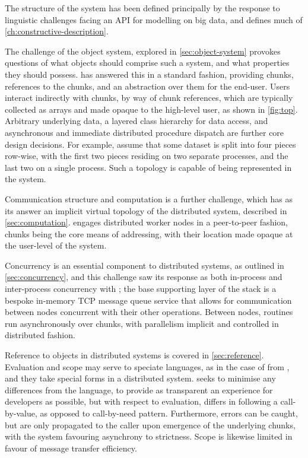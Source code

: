 The structure of the \lsr{} system has been defined principally by the response to linguistic challenges facing an API for modelling on big data, and defines much of \cref{ch:constructive-description}.

The challenge of the object system, explored in \cref{sec:object-system} provokes questions of what objects should comprise such a system, and what properties they should possess.
\lsr{} has answered this in a standard fashion, providing chunks, references to the chunks, and an abstraction over them for the end-user.
Users interact indirectly with chunks, by way of chunk references, which are typically collected as arrays and made opaque to the high-level user, as shown in \cref{fig:top}.
Arbitrary underlying data, a layered class hierarchy for data access, and asynchronous and immediate distributed procedure dispatch are further core design decisions.
For example, assume that some dataset is split into four pieces row-wise, with the first two pieces residing on two separate processes, and the last two on a single process.
Such a topology is capable of being represented in the \lsr{} system.


Communication structure and computation is a further challenge, which has as its answer an implicit virtual topology of the distributed system, described in \cref{sec:computation}.
\lsr{} engages distributed worker nodes in a peer-to-peer fashion, chunks being the core means of addressing, with their location made opaque at the user-level of the system.

Concurrency is an essential component to distributed systems, as outlined in \cref{sec:concurrency}, and this challenge saw its response as both in-process and inter-process concurrency with \lsr{}; the base supporting layer of the \lsr{} stack is a bespoke in-memory TCP message queue service that allows for communication between nodes concurrent with their other operations.
Between nodes, routines run asynchronously over chunks, with parallelism implicit and controlled in distributed fashion.

Reference to objects in distributed systems is covered in \cref{sec:reference}.
Evaluation and scope may serve to speciate languages, as in the case of \R{} from , and they take special forms in a distributed system.
\lsr{} seeks to minimise any differences from the \R{} language, to provide as transparent an experience for developers as possible, but with respect to evaluation, differs in following a call-by-value, as opposed to call-by-need pattern.
Furthermore, errors can be caught, but are only propagated to the caller upon emergence of the underlying chunks, with the system favouring asynchrony to strictness.
Scope is likewise limited in favour of message transfer efficiency.

